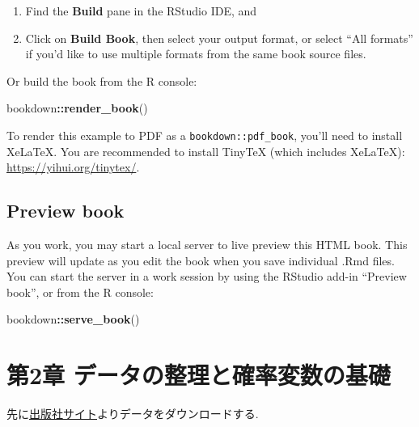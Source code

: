 \documentclass[
]{book}
\newenvironment{Shaded}{\begin{snugshade}}{\end{snugshade}}
\newcommand{\FunctionTok}[1]{\textcolor[rgb]{0.13,0.29,0.53}{\textbf{#1}}}
\newcommand{\NormalTok}[1]{#1}
\newcommand{\SpecialCharTok}[1]{\textcolor[rgb]{0.81,0.36,0.00}{\textbf{#1}}}
\begin{document}
\begin{enumerate}
\def\labelenumi{\arabic{enumi}.}
\item
  Find the \textbf{Build} pane in the RStudio IDE, and
\item
  Click on \textbf{Build Book}, then select your output format, or select ``All formats'' if you'd like to use multiple formats from the same book source files.
\end{enumerate}

Or build the book from the R console:

\begin{Shaded}
\begin{Highlighting}[]
\NormalTok{bookdown}\SpecialCharTok{::}\FunctionTok{render\_book}\NormalTok{()}
\end{Highlighting}
\end{Shaded}

To render this example to PDF as a \texttt{bookdown::pdf\_book}, you'll need to install XeLaTeX. You are recommended to install TinyTeX (which includes XeLaTeX): \url{https://yihui.org/tinytex/}.

\hypertarget{preview-book}{%
\section{Preview book}\label{preview-book}}

As you work, you may start a local server to live preview this HTML book. This preview will update as you edit the book when you save individual .Rmd files. You can start the server in a work session by using the RStudio add-in ``Preview book'', or from the R console:

\begin{Shaded}
\begin{Highlighting}[]
\NormalTok{bookdown}\SpecialCharTok{::}\FunctionTok{serve\_book}\NormalTok{()}
\end{Highlighting}
\end{Shaded}

\hypertarget{ch2}{%
\chapter*{第2章 データの整理と確率変数の基礎}\label{ch2}}

先に\href{https://www.yuhikaku.co.jp/books/detail/9784641053854}{出版社サイト}よりデータをダウンロードする.
\end{document}
